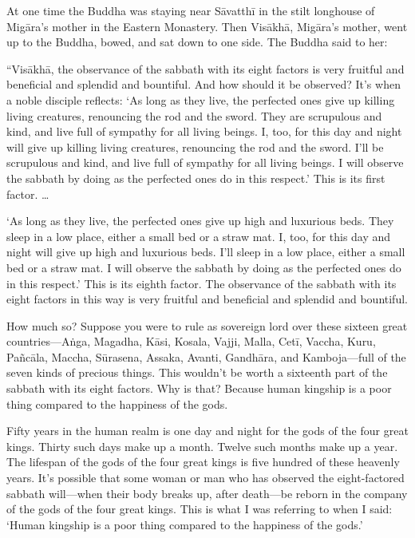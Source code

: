 \documentclass[12pt,openany]{book}%
\begin{document}
At one time the Buddha was staying near \textsanskrit{Sāvatthī} in the stilt longhouse of \textsanskrit{Migāra}’s mother in the Eastern Monastery. Then \textsanskrit{Visākhā}, \textsanskrit{Migāra}’s mother, went up to the Buddha, bowed, and sat down to one side. The Buddha said to her: 

“\textsanskrit{Visākhā}, the observance of the sabbath with its eight factors is very fruitful and beneficial and splendid and bountiful. And how should it be observed? It’s when a noble disciple reflects: ‘As long as they live, the perfected ones give up killing living creatures, renouncing the rod and the sword. They are scrupulous and kind, and live full of sympathy for all living beings. I, too, for this day and night will give up killing living creatures, renouncing the rod and the sword. I’ll be scrupulous and kind, and live full of sympathy for all living beings. I will observe the sabbath by doing as the perfected ones do in this respect.’ This is its first factor. … 

‘As long as they live, the perfected ones give up high and luxurious beds. They sleep in a low place, either a small bed or a straw mat. I, too, for this day and night will give up high and luxurious beds. I’ll sleep in a low place, either a small bed or a straw mat. I will observe the sabbath by doing as the perfected ones do in this respect.’ This is its eighth factor. The observance of the sabbath with its eight factors in this way is very fruitful and beneficial and splendid and bountiful. 

How much so? Suppose you were to rule as sovereign lord over these sixteen great countries—\textsanskrit{Aṅga}, Magadha, \textsanskrit{Kāsi}, Kosala, Vajji, Malla, \textsanskrit{Cetī}, Vaccha, Kuru, \textsanskrit{Pañcāla}, Maccha, \textsanskrit{Sūrasena}, Assaka, Avanti, \textsanskrit{Gandhāra}, and Kamboja—full of the seven kinds of precious things. This wouldn’t be worth a sixteenth part of the sabbath with its eight factors. Why is that? Because human kingship is a poor thing compared to the happiness of the gods. 

Fifty years in the human realm is one day and night for the gods of the four great kings. Thirty such days make up a month. Twelve such months make up a year. The lifespan of the gods of the four great kings is five hundred of these heavenly years. It’s possible that some woman or man who has observed the eight-factored sabbath will—when their body breaks up, after death—be reborn in the company of the gods of the four great kings. This is what I was referring to when I said: ‘Human kingship is a poor thing compared to the happiness of the gods.’ 
\end{document}
